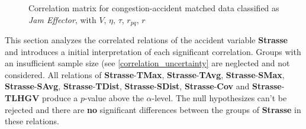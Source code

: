 \begin{figure}[!ht]
	\centering
	\caption{Correlation matrix for congestion-accident matched data classified as \textit{Jam Effector}, with $V$, $\eta$, $\tau$, $r_{pq}$, $r$}
	\label{img:correlation_matrix_matched_cramers}
\end{figure}

This section analyzes the correlated relations of the accident variable \textbf{Strasse} and introduces a initial interpretation of each significant correlation. Groups with an insufficient sample size (see \cref{correlation_uncertainty} are neglected and not considered. All relations of \textbf{Strasse}-\textbf{TMax}, \textbf{Strasse}-\textbf{TAvg}, \textbf{Strasse}-\textbf{SMax}, \textbf{Strasse}-\textbf{SAvg}, \textbf{Strasse}-\textbf{TDist}, \textbf{Strasse}-\textbf{SDist}, \textbf{Strasse}-\textbf{Cov} and \textbf{Strasse}-\textbf{TLHGV} produce a $p$-value above the $\alpha$-level. The null hypothesizes can't be rejected and there are \textbf{no} significant differences between the groups of \textbf{Strasse} in these relations.

